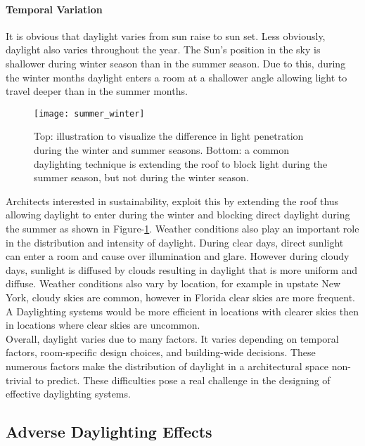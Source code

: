     \paragraph{Temporal Variation} 

    It is obvious that daylight varies from sun raise to sun set.
    Less obviously, daylight also varies throughout the year.
    The Sun's position in the sky is shallower during winter season than in the summer season. 
    Due to this, during the winter months daylight enters a room at a shallower angle allowing light to travel deeper than in the summer months.

    \begin{figure}[h]
    \centering
    \texttt{[image: summer\_winter]}
    \caption{Top: illustration to visualize the difference in light penetration during the winter and summer seasons. Bottom: a common daylighting technique is extending the roof to block light during the summer season, but not during the winter season.}
    \label{fig:summer_winter}
    \end{figure}

    Architects interested in sustainability, exploit this by extending the roof thus allowing daylight to enter during the winter and blocking direct daylight during the summer as shown in Figure-\ref{fig:summer_winter}.
    Weather conditions also play an important role in the distribution and intensity of daylight. 
    During clear days, direct sunlight can enter a room and cause over illumination and glare.
    However during cloudy days, sunlight is diffused by clouds resulting in daylight that is more uniform and diffuse.
    Weather conditions also vary by location, for example in upstate New York, cloudy skies are common, however in Florida clear skies are more frequent.
    A Daylighting systems would be more efficient in locations with clearer skies then in locations where clear skies are uncommon.\\

    Overall, daylight varies due to many factors. It varies depending on temporal factors, room-specific design choices, and building-wide decisions. These numerous factors make the distribution of daylight in a architectural space non-trivial to predict. 
    These difficulties pose a real challenge in the designing of effective daylighting systems.

  \subsection{Adverse Daylighting Effects}

